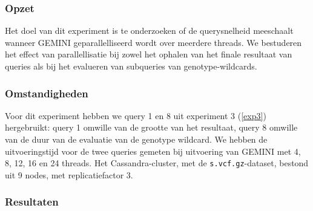 \subsubsection{Opzet}

Het doel van dit experiment is te onderzoeken of de querysnelheid meeschaalt wanneer GEMINI geparallelliseerd wordt over meerdere threads. We bestuderen het effect van parallellisatie bij zowel het ophalen van het finale resultaat van queries als bij het evalueren van subqueries van genotype-wildcards.

\subsubsection{Omstandigheden}

Voor dit experiment hebben we query 1 en 8 uit experiment 3 (\ref{exp3}) hergebruikt: query 1 omwille van de grootte van het resultaat, query 8 omwille van de duur van de evaluatie van de genotype wildcard. We hebben de uitvoeringstijd voor de twee queries gemeten bij uitvoering van GEMINI met 4, 8, 12, 16 en 24 threads. Het Cassandra-cluster, met de \texttt{s.vcf.gz}-dataset, bestond uit 9 nodes, met replicatiefactor 3.

\subsubsection{Resultaten}

